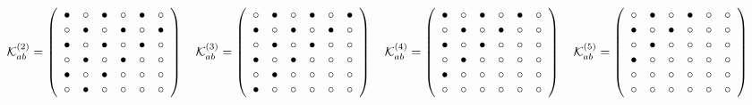 \begin{align}
 \ko^{(2)}_{ab}&= 
 \left( \begin {array}{cccccc} \bullet &\circ &\bullet &\circ 
&\bullet &\circ \\  \circ &\bullet &\circ &
\bullet &\circ &\bullet \\  \bullet &\circ 
&\bullet &\circ &\bullet &\circ \\  \circ &
\bullet &\circ &\bullet &\circ &\circ \\  
\bullet &\circ &\bullet &\circ &\circ &\circ 
\\  \circ &\bullet &\circ &\circ &\circ &
\circ \end {array} \right) 
~~~ \ko^{(3)}_{ab}= 
 \left( \begin {array}{cccccc} \circ &\bullet &\circ &\bullet 
&\circ &\bullet \\  \bullet &\circ &
\bullet &\circ &\bullet &\circ \\  \circ &
\bullet &\circ &\bullet &\circ &\circ \\  
\bullet &\circ &\bullet &\circ &\circ &\circ 
\\  \circ &\bullet &\circ &\circ &\circ &
\circ \\  \bullet &\circ &\circ &\circ &
\circ &\circ \end {array} \right) 
~~~ \ko^{(4)}_{ab}= 
 \left( \begin {array}{cccccc} \bullet &\circ &\bullet &\circ 
&\bullet &\circ \\  \circ &\bullet &\circ &
\bullet &\circ &\circ \\  \bullet &\circ &
\bullet &\circ &\circ &\circ \\  \circ &
\bullet &\circ &\circ &\circ &\circ \\  
\bullet &\circ &\circ &\circ &\circ &\circ 
\\  \circ &\circ &\circ &\circ &\circ &
\circ \end {array} \right) 
~~~ \ko^{(5)}_{ab}= 
 \left( \begin {array}{cccccc} \circ &\bullet &\circ &\bullet 
&\circ &\circ \\  \bullet &\circ &\bullet &
\circ &\circ &\circ \\  \circ &\bullet &
\circ &\circ &\circ &\circ \\  \bullet &
\circ &\circ &\circ &\circ &\circ \\  
\circ &\circ &\circ &\circ &\circ &\circ 
\\  \circ &\circ &\circ &\circ &\circ &
\circ \end {array} \right) \nonumber

\end{align}
